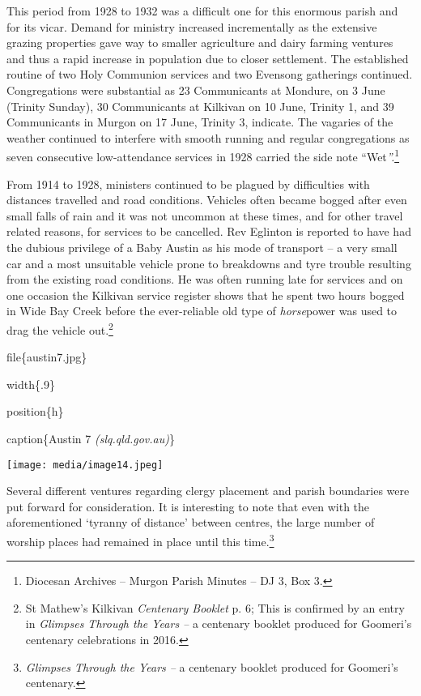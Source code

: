 This period from 1928 to 1932 was a difficult one for this enormous
parish and for its vicar. Demand for ministry increased incrementally as
the extensive grazing properties gave way to smaller agriculture and
dairy farming ventures and thus a rapid increase in population due to
closer settlement. The established routine of two Holy Communion
services and two Evensong gatherings continued. Congregations were
substantial as 23 Communicants at Mondure, on 3 June (Trinity Sunday),
30 Communicants at Kilkivan on 10 June, Trinity 1, and 39 Communicants
in Murgon on 17 June, Trinity 3, indicate. The vagaries of the weather
continued to interfere with smooth running and regular congregations as
seven consecutive low-attendance services in 1928 carried the side note
``Wet\emph{''.}\footnote{Diocesan Archives -- Murgon Parish Minutes --
  DJ 3, Box 3.}

From 1914 to 1928, ministers continued to be plagued by difficulties
with distances travelled and road conditions. Vehicles often became
bogged after even small falls of rain and it was not uncommon at these
times, and for other travel related reasons, for services to be
cancelled. Rev Eglinton is reported to have had the dubious privilege of
a Baby Austin as his mode of transport -- a very small car and a most
unsuitable vehicle prone to breakdowns and tyre trouble resulting from
the existing road conditions. He was often running late for services and
on one occasion the Kilkivan service register shows that he spent two
hours bogged in Wide Bay Creek before the ever-reliable old type of
\emph{horse}power was used to drag the vehicle out.\footnote{St Mathew's
  Kilkivan \emph{Centenary Booklet} p. 6; This is confirmed by an entry
  in \emph{Glimpses Through the Years --} a centenary booklet produced
  for Goomeri's centenary celebrations in 2016.}

file\{austin7.jpg\}

width\{.9\}

position\{h\}

caption\{Austin 7 \emph{(slq.qld.gov.au)}\}

\texttt{[image: media/image14.jpeg]}

Several different ventures regarding clergy placement and parish
boundaries were put forward for consideration. It is interesting to note
that even with the aforementioned `tyranny of distance' between centres,
the large number of worship places had remained in place until this
time.\footnote{\emph{Glimpses Through the Years --} a centenary booklet
  produced for Goomeri's centenary.}

